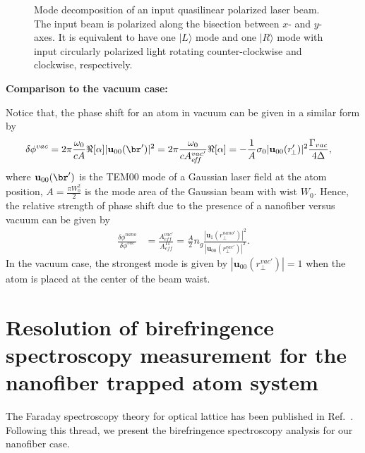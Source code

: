 \documentclass[]{report}
\begin{document}
\begin{figure}
\centering{}
\caption{Mode decomposition of an input quasilinear polarized laser beam. The input beam is polarized along the bisection between $ x $- and $ y $-axes. It is equivalent to have one $ |L\rangle $ mode and one $ |R\rangle $ mode with input circularly polarized light rotating counter-clockwise and clockwise, respectively.}
\end{figure}

\bigskip
\textbf{Comparison to the vacuum case:}

Notice that, the phase shift for an atom in vacuum can be given in a similar form by
\begin{align}
\delta\phi^{vac} &= 2\pi \frac{\omega_0}{cA} \Re[\alpha] |\mathbf{u}_{00}(\br')|^2 =  2\pi \frac{\omega_0}{c A^{vac'}_{e\!f\!f}} \Re[\alpha]=-\frac{1}{A} \sigma_0 |\mathbf{u}_{00} (r'_{\!\perp})|^2 \frac{\Gamma_{vac}}{4\Delta},
\end{align}
where $\mathbf{u}_{00}(\br')  $ is the TEM00 mode of a Gaussian laser field at the atom position, $ A=\frac{\pi W_0^2}{2} $ is the mode area of the Gaussian beam with wist $ W_0 $. Hence, the relative strength of phase shift due to the presence of a nanofiber versus vacuum can be given by
\begin{align}
\frac{\delta\phi^{nano}}{\delta\phi^{vac}} &=\frac{A_{e\!f\!f}^{vac'}}{A_{e\!f\!f}^{11}}= \frac{A}{2} \!n_g\! \frac{|\mathbf{u}_1(r_\perp^{nano'})|^2}{|\mathbf{u}_{00}(r_\perp^{vac'})|^2}.
\end{align}
In the vacuum case, the strongest mode is given by $ |\mathbf{u}_{00}(r_\perp^{vac'})|=1 $ when the atom is placed at the center of the beam waist. 

\section{Resolution of birefringence spectroscopy measurement for the nanofiber trapped atom system}\label{sec:birefringenceresolution}
The Faraday spectroscopy theory for optical lattice has been published in Ref.~\cite{Smith2003a}. Following this thread, we present the birefringence spectroscopy analysis for our nanofiber case.
\end{document}
